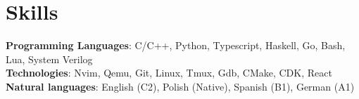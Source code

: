 \documentclass[letterpaper,11pt]{article}
\begin{document}
\section{Skills}
\begin{itemize}[leftmargin=0.15in, label={}]
  \small{\item{
                \textbf{Programming Languages}{: C/C++, Python, Typescript, Haskell, Go, Bash, Lua, System Verilog} \\
                \textbf{Technologies}{: Nvim, Qemu, Git, Linux, Tmux, Gdb, CMake, CDK, React} \\
                \textbf{Natural languages}{: English (C2), Polish (Native), Spanish (B1), German (A1) } \\
          }}
\end{itemize}
\vspace{-16pt}
\end{document}
